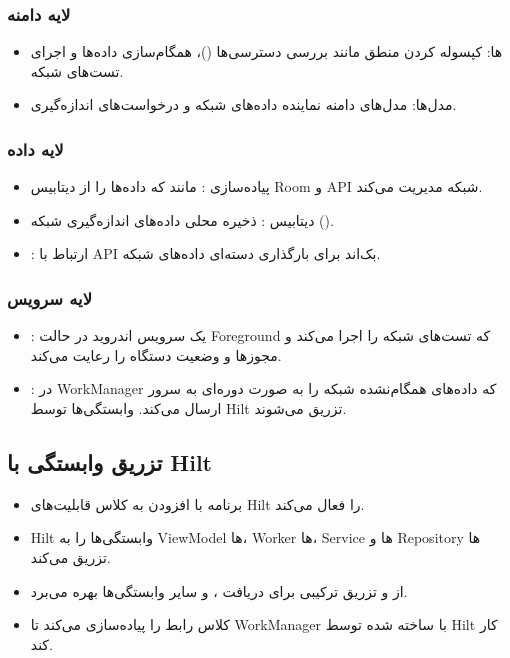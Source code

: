 \subsubsection{لایه دامنه}
\begin{itemize}
    \item {} ها: کپسوله کردن منطق مانند بررسی دسترسی‌ها ()، همگام‌سازی داده‌ها و اجرای تست‌های شبکه.
    \item مدل‌ها: مدل‌های دامنه نماینده داده‌های شبکه و درخواست‌های اندازه‌گیری.
\end{itemize}

\subsubsection{لایه داده}
\begin{itemize}
    \item پیاده‌سازی : مانند  که داده‌ها را از دیتابیس Room و API شبکه مدیریت می‌کند.
    \item دیتابیس : ذخیره محلی داده‌های اندازه‌گیری شبکه ().
    \item {}: ارتباط با API بک‌اند برای بارگذاری دسته‌ای داده‌های شبکه.
\end{itemize}

\subsubsection{لایه سرویس}
\begin{itemize}
    \item {}: یک سرویس اندروید در حالت Foreground که تست‌های شبکه را اجرا می‌کند و مجوزها و وضعیت دستگاه را رعایت می‌کند.
    \item {}:  در WorkManager که داده‌های همگام‌نشده شبکه را به صورت دوره‌ای به سرور ارسال می‌کند. وابستگی‌ها توسط Hilt تزریق می‌شوند.
\end{itemize}

\subsection{تزریق وابستگی با Hilt}
\begin{itemize}
    \item برنامه با افزودن  به کلاس  قابلیت‌های Hilt را فعال می‌کند.
    \item Hilt وابستگی‌ها را به ViewModel ها، Worker ها، Service ها و Repository ها تزریق می‌کند.
    \item {} از  و تزریق ترکیبی  برای دریافت ،  و سایر وابستگی‌ها بهره می‌برد.
    \item کلاس  رابط  را پیاده‌سازی می‌کند تا WorkManager با  ساخته شده توسط Hilt کار کند.
\end{itemize}

